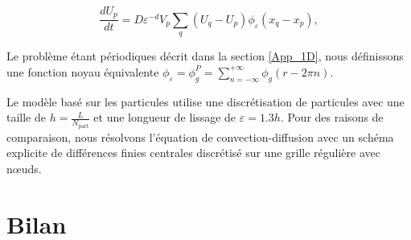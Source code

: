 \begin{equation*}
    \frac{dU_p}{dt} = D \varepsilon^{-d} V_p \sum_q (U_q - U_p) \phi_\varepsilon( x_q -  x_p),
\end{equation*}

Le problème étant périodiques décrit dans la section \ref{App_1D}, nous définissons une fonction noyau équivalente $\phi_\varepsilon= \phi^P_g = \sum_{n=-\infty}^{+\infty} \phi_g(r - 2 \pi n)$.

Le modèle basé sur les particules utilise une discrétisation de \npart{} particules avec une taille de $h = \frac{L}{N_{\text{part}}}$ et une longueur de lissage de $\varepsilon = 1.3 h$.
Pour des raisons de comparaison, nous résolvons l'équation de convection-diffusion avec un schéma explicite de différences finies centrales discrétisé sur une grille régulière avec \ngrid{} nœuds.
\section{Bilan}